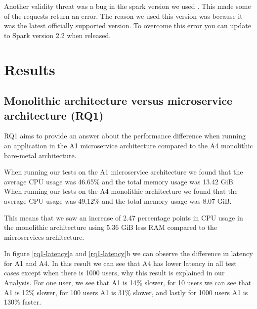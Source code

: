 \documentclass[a4paper,oneside]{bth}
\begin{document}
\par\vspace{0.5cm}
Another validity threat was a bug in the spark version we used \cite{SparkBug}. This made some of the requests return an error. The reason we used this version was because it was the latest officially supported version. To overcome this error you can update to Spark version 2.2 when released.


\chapter{Results} \label{Results}

\section{Monolithic architecture versus microservice architecture (RQ1)}
RQ1 aims to provide an answer about the performance difference when running an application in the A1 microservice architecture compared to the A4 monolithic bare-metal architecture.

\par\vspace{0.5cm}
When running our tests on the A1 microservice architecture we found that the average CPU usage was 46.65\% and the total memory usage was 13.42 GiB. When running our tests on the A4 monolithic architecture we found that the average CPU usage was 49.12\% and the total memory usage was 8.07 GiB. 

\par\vspace{0.5cm}
This means that we saw an increase of 2.47 percentage points in CPU usage in the monolithic architecture using 5.36 GiB less RAM compared to the microservices architecture.

\par\vspace{0.5cm}
In figure \ref{rq1-latency}a and \ref{rq1-latency}b  we can observe the difference in latency for A1 and A4. In this result we can see that A4 has lower latency in all test cases except when there is 1000 users, why this result is explained in our Analysis. For one user, we see that A1 is 14\% slower, for 10 users we can see that A1 is 12\% slower, for 100 users A1 is 31\% slower, and lastly for 1000 users A1 is 130\% faster. 
\end{document}
